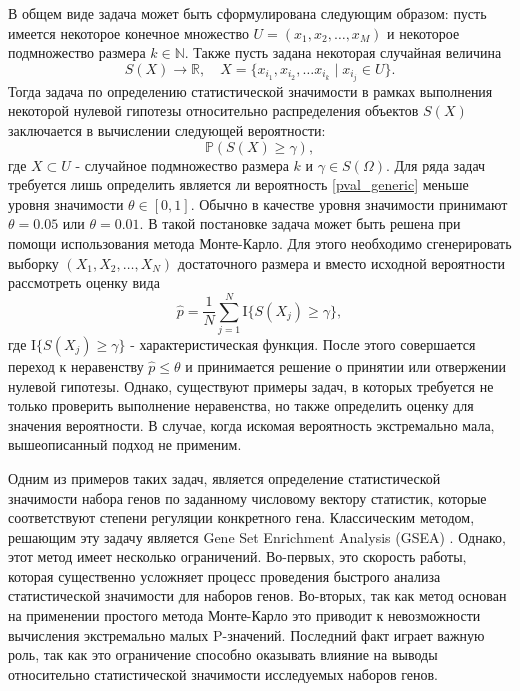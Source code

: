 В общем виде задача может быть сформулирована следующим образом: пусть имеется некоторое конечное множество $U = \left(x_1, x_2, \ldots, x_M \right)$ и некоторое подмножество размера $k \in \mathbb{N}$. Также пусть задана некоторая случайная величина 
\begin{equation} \label{pval_generic}
    S(X) \rightarrow \mathbb{R}, \quad X = \{x_{i_1}, x_{i_2}, \ldots x_{i_k} \mid x_{i_j} \in U\}.
\end{equation}
Тогда задача по определению статистической значимости в рамках выполнения некоторой нулевой гипотезы относительно распределения объектов $S(X)$ заключается в вычислении следующей вероятности:
\[
    \mathbb{P} \left(S(X) \geqslant \gamma \right),
\]
где $X \subset U$ - случайное подмножество размера $k$ и $\gamma \in S(\Omega)$.
Для ряда задач требуется лишь определить является ли вероятность \ref{pval_generic} меньше уровня значимости $\theta \in [0, 1]$.
Обычно в качестве уровня значимости принимают $\theta = 0.05$ или $\theta = 0.01$.
В такой постановке задача может быть решена при помощи использования метода Монте-Карло.
Для этого необходимо сгенерировать выборку $\left(X_1, X_2, \ldots, X_N \right)$ достаточного размера и вместо исходной вероятности рассмотреть оценку вида
\begin{equation}\label{phat_crude}
    \hat{p} = \frac{1}{N} \sum\limits_{j = 1}^{N} \mathrm{I} \{S(X_j) \geqslant \gamma \},
\end{equation}
где $\mathrm{I} \{S(X_j) \geqslant \gamma \}$ - характеристическая функция. 
После этого совершается переход к неравенству $\hat{p} \leqslant \theta$ и принимается решение о принятии или отвержении нулевой гипотезы.
Однако, существуют примеры задач, в которых требуется не только проверить выполнение неравенства, но также определить оценку для значения вероятности.
В случае, когда искомая вероятность экстремально мала, вышеописанный подход не применим.

Одним из примеров таких задач, является определение статистической значимости набора генов по заданному числовому вектору статистик, которые соответствуют степени регуляции конкретного гена.
Классическим методом, решающим эту задачу является Gene Set Enrichment Analysis (GSEA) \cite{subramanian2005gene}.
Однако, этот метод имеет несколько ограничений.
Во-первых, это скорость работы, которая существенно усложняет процесс проведения быстрого анализа статистической значимости для наборов генов.
Во-вторых, так как метод основан на применении простого метода Монте-Карло это приводит к невозможности вычисления экстремально малых P-значений.
Последний факт играет важную роль, так как это ограничение способно оказывать влияние на выводы относительно статистической значимости исследуемых наборов генов.

